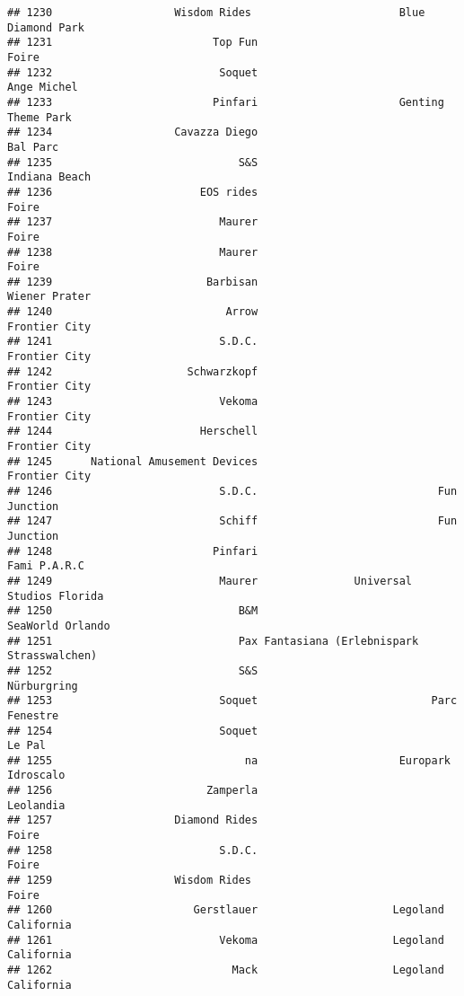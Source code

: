 \documentclass[
]{article}
\begin{document}
\begin{verbatim}
## 1230                   Wisdom Rides                       Blue Diamond Park 
## 1231                         Top Fun                                   Foire
## 1232                          Soquet                             Ange Michel
## 1233                         Pinfari                      Genting Theme Park
## 1234                   Cavazza Diego                                Bal Parc
## 1235                             S&S                           Indiana Beach
## 1236                       EOS rides                                   Foire
## 1237                          Maurer                                   Foire
## 1238                          Maurer                                   Foire
## 1239                        Barbisan                           Wiener Prater
## 1240                           Arrow                           Frontier City
## 1241                          S.D.C.                           Frontier City
## 1242                     Schwarzkopf                           Frontier City
## 1243                          Vekoma                           Frontier City
## 1244                       Herschell                           Frontier City
## 1245      National Amusement Devices                           Frontier City
## 1246                          S.D.C.                            Fun Junction
## 1247                          Schiff                            Fun Junction
## 1248                         Pinfari                            Fami P.A.R.C
## 1249                          Maurer               Universal Studios Florida
## 1250                             B&M                        SeaWorld Orlando
## 1251                             Pax Fantasiana (Erlebnispark Strasswalchen)
## 1252                             S&S                             Nürburgring
## 1253                          Soquet                           Parc Fenestre
## 1254                          Soquet                                  Le Pal
## 1255                              na                      Europark Idroscalo
## 1256                        Zamperla                               Leolandia
## 1257                   Diamond Rides                                   Foire
## 1258                          S.D.C.                                   Foire
## 1259                   Wisdom Rides                                    Foire
## 1260                      Gerstlauer                     Legoland California
## 1261                          Vekoma                     Legoland California
## 1262                            Mack                     Legoland California

\end{verbatim}
\end{document}
